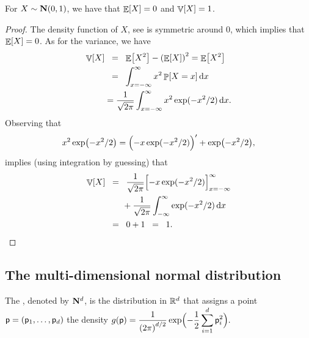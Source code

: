 \begin{lemma}
    For $X \sim \NormalY{0}{1}$, we have that $\mathop{\mathbb{E}}\!\left[ {X} \right] = 0$ and
    $\mathop{\mathbb{V}}\!\left[ {X} \right] = 1$.
\end{lemma}
\begin{proof}
    The density function of $X$, see  is symmetric
    around $0$, which implies that $\mathop{\mathbb{E}}\!\left[ {X} \right] =0$. As for the variance,
    we have
    \begin{align*}
        \Var{X}%
        &\EQ%
        \Ex{X^2} - \pth{\Ex{X}}^2%
        =%
        \Ex{X^2}%
        \\&
        \EQ%
        \int_{x=-\infty}^\infty x^2 \Prob{X =x}
        \diffX{x}
        \\&
        =
        \frac{1}{\sqrt{2\pi}}\int_{x=-\infty}^\infty x^2\exp(-x^2/2)
        \diffX{x}.        
    \end{align*}
    Observing that
    \begin{equation*}
        x^2 \exp\bigl( -x^2/2 \bigr)%
        =%
        \Bigl( - x \exp(-x^2/2)\Bigr)'
        + \exp\bigl(-x^2/2\bigr), 
    \end{equation*}
    implies (using integration by guessing) that
    \begin{align*}
        \Var{X}
        &\EQ%
        \frac{1}{\sqrt{2\pi}}
        \Bigl[ -x \exp(-x^2/2) \Bigr]_{x=-\infty}^{\infty}
        \\&
        \qquad+
        \frac{1}{\sqrt{2\pi}}
        \int_{-\infty}^\infty \exp(-x^2/2) \diffX{x} %
        \\&
        \EQ%
        0+1
        \EQ%
        1.
    \end{align*}
\end{proof}



\subsection{The multi-dimensional normal %
   distribution}

The , denoted by
$\mathbf{N}^{d}$, is the distribution in $\mathbb{R}^d$ that assigns
a point $\mathsf{p} = ( \mathsf{p}_1, \ldots, \mathsf{p}_d)$ the density
    \begin{math}
        \displaystyle g \pth{\pnt}%
        =%
        \frac{1}{\pth{2\pi}^{\hdim/2} } \exp \Bigl( - \frac{1}{2}
        \sum_{i=1}^\hdim \pnt_i^2 \Bigr).
    \end{math}
%

